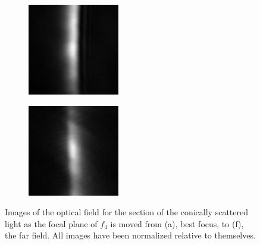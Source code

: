 \begin{figure}[ht]
\begin{subfigure}[b]{4cm}
  \end{subfigure}
  \begin{subfigure}[b]{4cm}
    \includegraphics[width=4cm,keepaspectratio]{interference/figures/move/321-8.jpg}
    \caption{}
  \end{subfigure}
  \begin{subfigure}[b]{4cm}
    \includegraphics[width=4cm,keepaspectratio]{interference/figures/move/321-9.jpg}
    \caption{}
  \end{subfigure}
  \caption{Images of the optical field for the section of the conically
    scattered light as the focal plane of $f_4$ is moved from (a), best focus,
    to (f), the far field.  All images have been normalized relative to
    themselves.}
  \label{fig:321up}
\end{figure}

